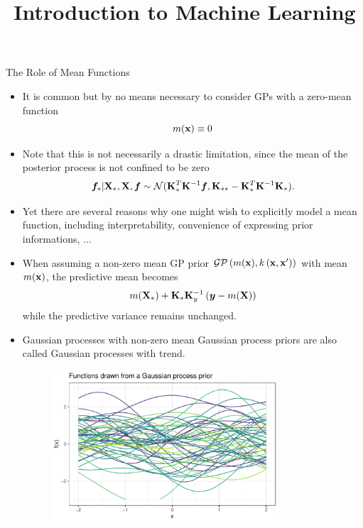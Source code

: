 




\newcommand{\titlefigure}{figure_man/gp-sample/gp-sample-2-4.pdf} %
\newcommand{\learninggoals}{
  \item Understand how mean functions can be used to model trends 
}

\title{Introduction to Machine Learning}
\date{}





\begin{vbframe}{The Role of Mean Functions}

\begin{itemize}
  \item It is common but by no means necessary to consider GPs with a zero-mean function 
  $$
    m(\mathbf{x}) \equiv 0
  $$
  \item Note that this is not necessarily a drastic limitation, since the mean of the posterior process is not confined to be zero 
  $$
    \bm{f}_* | \mathbf{X}_*, \mathbf{X}, \bm{f} \sim \mathcal{N}(\mathbf{K}_{*}^{T}\mathbf{K}^{-1}\bm{f}, \mathbf{K}_{**} - \mathbf{K}_*^T \mathbf{K} ^{-1}\mathbf{K}_*).
  $$
  \item Yet there are several reasons why one might wish to explicitly model a mean function, including interpretability, convenience of expressing prior informations, ... 
  \item When assuming a non-zero mean GP prior $\mathcal{GP}\left(m(\mathbf{x}), k\left(\mathbf{x}, \mathbf{x}^{\prime} \right) \right)$ with mean $m(\mathbf{x})$, the predictive mean becomes 
  $$
    m(\mathbf{X}_*) + \mathbf{K}_*\mathbf{K}_y^{-1}\left(\bm{y} - m(\mathbf{X})\right)
  $$
  while the predictive variance remains unchanged. 
  
  \framebreak
  
  \item Gaussian processes with non-zero mean Gaussian process priors are also called Gaussian processes with trend.  
\vspace{.3cm}

\begin{figure}
\includegraphics[width=0.8\textwidth]{figure_man/gp-sample/gp-sample-1-1.pdf}
\end{figure}


\end{itemize}
\end{vbframe}
